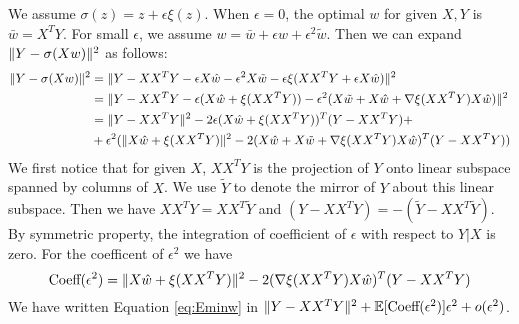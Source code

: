 \documentclass{article}
\DeclarePairedDelimiter\norm{\lVert}{\rVert}
\def\E{\mathbb{E}}
\begin{document}
We assume $\sigma(z) = z + \epsilon \xi(z)$. When $\epsilon = 0$, the optimal $w$ for given $X, Y$ is 
$\bar{w} = X^T Y $. For small $\epsilon$, we assume $ w = \bar{w} + \epsilon \hat{w} + \epsilon^2 \tilde{w}$. Then we can expand $\norm{Y - \sigma (X w ) }^2$ as follows:
\begin{align*}
\norm{Y - \sigma (X w ) }^2 & = \norm{Y - XX^T Y - \epsilon X \hat{w} - \epsilon^2 X \tilde{w} - \epsilon \xi(XX^T Y + \epsilon X\hat{w}) }^2 \\
& = \norm{ Y - XX^T Y - \epsilon (X\hat{w} + \xi(XX^T Y)) - \epsilon^2(X\tilde{w} + X\hat{w} + \nabla \xi(XX^TY)X\hat{w})}^2 \\
& = \norm{Y-XX^T Y }^2 - 2 \epsilon (X \hat{w} + \xi(XX^TY))^T (Y-XX^TY) +\\
& +\epsilon^2(\norm{X\hat{w} + \xi(XX^TY)}^2 - 2 (X\hat{w} + X \tilde{w}+ \nabla \xi(XX^TY)X\hat{w})^T(Y-XX^TY))
\end{align*}
We first notice that for given $X$, $XX^TY$ is the projection of $Y$ onto linear subspace spanned by columns of $X$. We use $\tilde{Y}$ to denote the mirror of $Y$ about this linear subspace. Then we have
$XX^T Y = XX^T \tilde{Y}$ and $(Y- XX^TY) = -(\tilde{Y} - XX^T \tilde{Y})$. By symmetric property, the integration of coefficient of $\epsilon$ with respect to $Y|X$ is zero. For the coefficent of $\epsilon^2$ we have
\begin{equation*}
\textrm{Coeff}(\epsilon^2)  =  \norm{X\hat{w} + \xi(XX^TY)}^2 - 2 (\nabla \xi(XX^TY)X\hat{w})^T(Y-XX^TY)
\end{equation*}
We have written Equation \eqref{eq:Eminw} in $ \norm{Y - X X^T Y}^2 + \E[\textrm{Coeff}(\epsilon^2)] \epsilon^2 + o(\epsilon^2)$.
\end{document}
